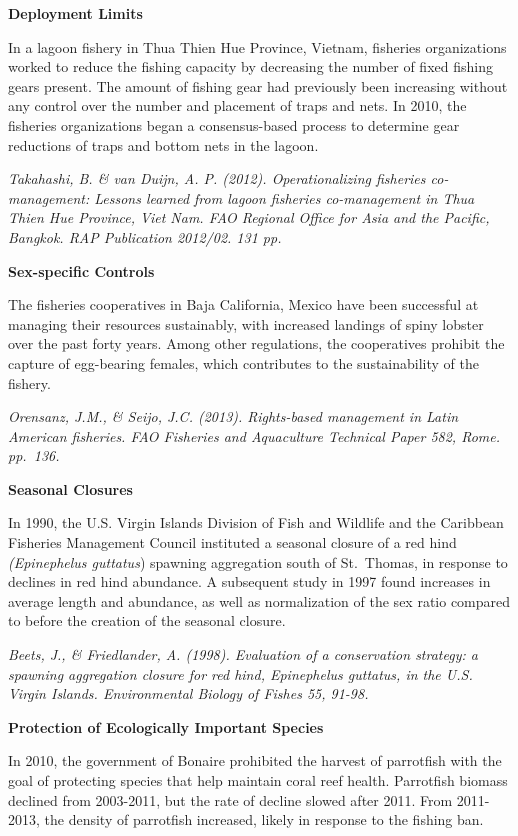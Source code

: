 \documentclass[]{book}
\begin{document}
\textbf{Deployment Limits}

In a lagoon fishery in Thua Thien Hue Province, Vietnam, fisheries
organizations worked to reduce the fishing capacity by decreasing the
number of fixed fishing gears present. The amount of fishing gear had
previously been increasing without any control over the number and
placement of traps and nets. In 2010, the fisheries organizations began
a consensus-based process to determine gear reductions of traps and
bottom nets in the lagoon.

\emph{Takahashi, B. \& van Duijn, A. P. (2012). Operationalizing
fisheries co-management: Lessons learned from lagoon fisheries
co-management in Thua Thien Hue Province, Viet Nam. FAO Regional Office
for Asia and the Pacific, Bangkok. RAP Publication 2012/02. 131 pp.}

\textbf{Sex-specific Controls}

The fisheries cooperatives in Baja California, Mexico have been
successful at managing their resources sustainably, with increased
landings of spiny lobster over the past forty years. Among other
regulations, the cooperatives prohibit the capture of egg-bearing
females, which contributes to the sustainability of the fishery.

\emph{Orensanz, J.M., \& Seijo, J.C. (2013). Rights-based management in
Latin American fisheries. FAO Fisheries and Aquaculture Technical Paper
582, Rome. pp.~136.}

\textbf{Seasonal Closures}

In 1990, the U.S. Virgin Islands Division of Fish and Wildlife and the
Caribbean Fisheries Management Council instituted a seasonal closure of
a red hind \emph{(Epinephelus guttatus}) spawning aggregation south of
St.~Thomas, in response to declines in red hind abundance. A subsequent
study in 1997 found increases in average length and abundance, as well
as normalization of the sex ratio compared to before the creation of the
seasonal closure.

\emph{Beets, J., \& Friedlander, A. (1998). Evaluation of a conservation
strategy: a spawning aggregation closure for red hind, Epinephelus
guttatus, in the U.S. Virgin Islands. Environmental Biology of Fishes
55, 91-98.}

\textbf{Protection of Ecologically Important Species}

In 2010, the government of Bonaire prohibited the harvest of parrotfish
with the goal of protecting species that help maintain coral reef
health. Parrotfish biomass declined from 2003-2011, but the rate of
decline slowed after 2011. From 2011-2013, the density of parrotfish
increased, likely in response to the fishing ban.
\end{document}
